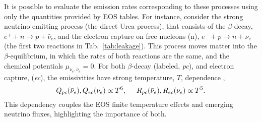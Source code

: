 It is possible to evaluate the emission rates corresponding to these processes 
using only the quantities provided by \ac{EOS} tables.
%
For instance, consider the strong neutrino emitting process (the direct Urca process), 
that consists of the $\beta$-decay, $e^+ + n \rightarrow p + \bar{\nu}_e$, 
and the electron capture on free nucleons (n), $e^{-} + p \rightarrow n + \nu_e$ 
(the first two reactions in Tab.~\ref{tab:leakage}). 
This process moves matter into the $\beta$-equilibrium, in which the rates 
of both reactions are the same, and the chemical potentials $\mu_{\nu_e,\bar{\nu}_e}=0$.
%
For both $\beta$-decay (labeled, \textit{pc}), and electron capture, 
(\textit{ec}), the emissivities 
have strong temperature, $T$, dependence \citep{Galeazzi:2013mia}, 
%
\begin{equation}
Q_{pc}(\bar{\nu}_e), Q_{ec}(\nu_e) \propto T^6, \hspace{5mm} R_{pc}(\bar{\nu}_e),R_{ec}(\nu_e)\propto T^5. \\
\end{equation}
%
This dependency couples the \ac{EOS} finite temperature effects and emerging neutrino fluxes,
highlighting the importance of both.
%
%


